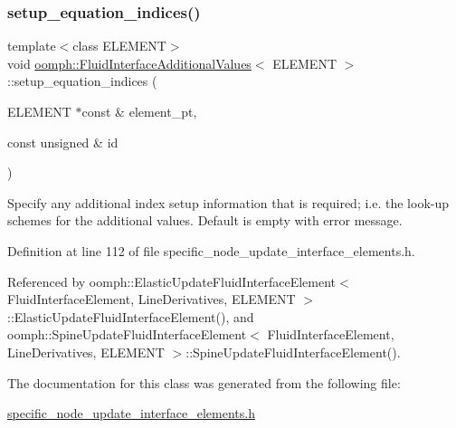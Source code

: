 \subsubsection{\texorpdfstring{setup\+\_\+equation\+\_\+indices()}{setup\_equation\_indices()}}
{\footnotesize\ttfamily template$<$class E\+L\+E\+M\+E\+NT$>$ \\
void \hyperlink{classoomph_1_1FluidInterfaceAdditionalValues}{oomph\+::\+Fluid\+Interface\+Additional\+Values}$<$ E\+L\+E\+M\+E\+NT $>$\+::setup\+\_\+equation\+\_\+indices (\begin{DoxyParamCaption}\item[{E\+L\+E\+M\+E\+NT $\ast$const \&}]{element\+\_\+pt,  }\item[{const unsigned \&}]{id }\end{DoxyParamCaption})\hspace{0.3cm}{\ttfamily [inline]}}



Specify any additional index setup information that is required; i.\+e. the look-\/up schemes for the additional values. Default is empty with error message. 



Definition at line 112 of file specific\+\_\+node\+\_\+update\+\_\+interface\+\_\+elements.\+h.



Referenced by oomph\+::\+Elastic\+Update\+Fluid\+Interface\+Element$<$ Fluid\+Interface\+Element, Line\+Derivatives, E\+L\+E\+M\+E\+N\+T $>$\+::\+Elastic\+Update\+Fluid\+Interface\+Element(), and oomph\+::\+Spine\+Update\+Fluid\+Interface\+Element$<$ Fluid\+Interface\+Element, Line\+Derivatives, E\+L\+E\+M\+E\+N\+T $>$\+::\+Spine\+Update\+Fluid\+Interface\+Element().



The documentation for this class was generated from the following file\+:\begin{DoxyCompactItemize}
\item 
\hyperlink{specific__node__update__interface__elements_8h}{specific\+\_\+node\+\_\+update\+\_\+interface\+\_\+elements.\+h}\end{DoxyCompactItemize}
